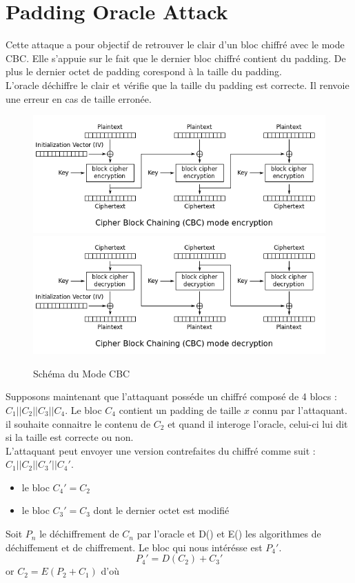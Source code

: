 
\chapter{Padding Oracle Attack}
\label{chapter:POA}

Cette attaque a pour objectif de retrouver le clair d'un bloc chiffré 
avec le mode CBC. Elle s'appuie sur le fait que le dernier bloc chiffré
contient du padding. De plus le dernier octet de padding corespond à la
taille du padding.\\
L'oracle  déchiffre le clair et vérifie que la taille du padding est correcte. 
Il renvoie une erreur en cas de taille erronée.\\

\begin{figure}[h]
\label{fig:cbc}
\includegraphics[scale=0.5]{CBC_Encrypt}\\
\includegraphics[scale=0.5]{CBC_Decrypt}
\caption{Schéma du Mode CBC}
\end{figure}

Supposons maintenant que l'attaquant posséde un chiffré composé de 4 blocs :
$C_1||C_2||C_3||C_4$. Le bloc $C_4$ contient un padding de taille $x$ connu par l'attaquant.
il souhaite connaitre le contenu de $C_2$ et quand il interoge l'oracle, celui-ci lui dit
si la taille est correcte ou non.\\
L'attaquant peut envoyer une version contrefaites du chiffré comme suit :
$C_1||C_2||C_3'||C_4'$.\\
\begin{itemize}
\item le bloc $C_4'=C_2$
\item le bloc $C_3'= C_3$ dont le dernier octet est modifié
\end{itemize}
Soit $P_n$ le déchiffrement de $C_n$ par l'oracle et D() et E() les algorithmes
de déchiffement et de chiffrement. 
Le bloc qui nous intérésse est $P_4'$.
\[P_4' = D(C_2) + C_3'\]
or $C_2 = E(P_2 + C_1)$ d'où

